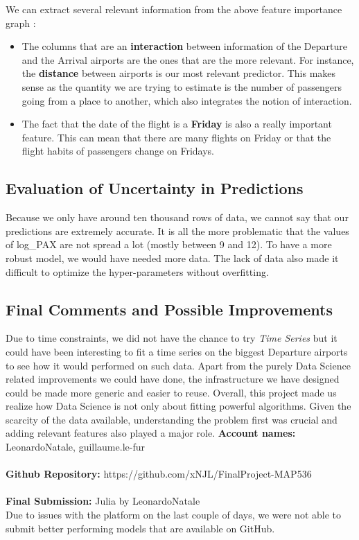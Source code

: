 \documentclass[a4paper,12pt,twoside]{article}
\begin{document}
We can extract several relevant information from the above feature importance graph :

\begin{itemize}
	\item The columns that are an \textbf{interaction} between information of the Departure and the Arrival airports are the ones that are the more relevant. For instance, the \textbf{distance} between airports is our most relevant predictor. This makes sense as the quantity we are trying to estimate is the number of passengers going from a place to another, which also integrates the notion of interaction.
	\item The fact that the date of the flight is a \textbf{Friday} is also a really important feature. This can mean that there are many flights on Friday or that the flight habits of passengers change on Fridays.
\end{itemize}

\subsection{Evaluation of Uncertainty in Predictions}

Because we only have around ten thousand rows of data, we cannot say that our predictions are extremely accurate. It is all the more problematic that the values of log\_PAX are not spread a lot (mostly between 9 and 12). To have a more robust model, we would have needed more data. The lack of data also made it difficult to optimize the hyper-parameters without overfitting.


\subsection{Final Comments and Possible Improvements}

Due to time constraints, we did not have the chance to try \textit{Time Series} but it could have been interesting to fit a time series on the biggest Departure airports to see how it would performed on such data.
Apart from the purely Data Science related improvements we could have done, the infrastructure we have designed could be made more generic and easier to reuse.
Overall, this project made us realize how Data Science is not only about fitting powerful algorithms. Given the scarcity of the data available, understanding the problem first was crucial and adding relevant features also played a major role.
\newline \newline \newline
\textbf{Account names:}
LeonardoNatale, guillaume.le-fur \\\\
\textbf{Github Repository:}
https://github.com/xNJL/FinalProject-MAP536 \\\\
\textbf{Final Submission:}
Julia by LeonardoNatale \\
Due to issues with the platform on the last couple of days, we were not able to submit better performing models that are available on GitHub.
\end{document}

